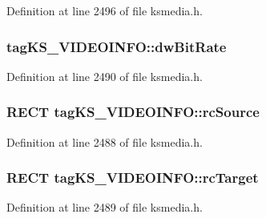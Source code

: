 Definition at line 2496 of file ksmedia.\+h.

\subsubsection[{\texorpdfstring{dw\+Bit\+Rate}{dwBitRate}}]{ tag\+K\+S\+\_\+\+V\+I\+D\+E\+O\+I\+N\+F\+O\+::dw\+Bit\+Rate}\hypertarget{structtag_k_s___v_i_d_e_o_i_n_f_o_a16268bf2cd18f8598140e8cfb4865067}{}\label{structtag_k_s___v_i_d_e_o_i_n_f_o_a16268bf2cd18f8598140e8cfb4865067}


Definition at line 2490 of file ksmedia.\+h.

\subsubsection[{\texorpdfstring{rc\+Source}{rcSource}}]{\setlength{\rightskip}{0pt plus 5cm}R\+E\+CT tag\+K\+S\+\_\+\+V\+I\+D\+E\+O\+I\+N\+F\+O\+::rc\+Source}\hypertarget{structtag_k_s___v_i_d_e_o_i_n_f_o_a9050c2f1adccecb1ccc8536d2b11a088}{}\label{structtag_k_s___v_i_d_e_o_i_n_f_o_a9050c2f1adccecb1ccc8536d2b11a088}


Definition at line 2488 of file ksmedia.\+h.

\subsubsection[{\texorpdfstring{rc\+Target}{rcTarget}}]{\setlength{\rightskip}{0pt plus 5cm}R\+E\+CT tag\+K\+S\+\_\+\+V\+I\+D\+E\+O\+I\+N\+F\+O\+::rc\+Target}\hypertarget{structtag_k_s___v_i_d_e_o_i_n_f_o_a77ad115ba35d10418f83870f7b7d946d}{}\label{structtag_k_s___v_i_d_e_o_i_n_f_o_a77ad115ba35d10418f83870f7b7d946d}


Definition at line 2489 of file ksmedia.\+h.

